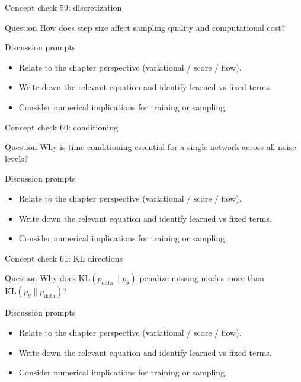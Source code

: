 \documentclass[aspectratio=169]{beamer}
\begin{document}
\begin{frame}{Concept check 59: discretization}
\begin{block}{Question}
How does step size affect sampling quality and computational cost?
\end{block}
\begin{block}{Discussion prompts}
\begin{itemize}
\item Relate to the chapter perspective (variational / score / flow).
\item Write down the relevant equation and identify learned vs fixed terms.
\item Consider numerical implications for training or sampling.
\end{itemize}
\end{block}
\end{frame}

\begin{frame}{Concept check 60: conditioning}
\begin{block}{Question}
Why is time conditioning essential for a single network across all noise levels?
\end{block}
\begin{block}{Discussion prompts}
\begin{itemize}
\item Relate to the chapter perspective (variational / score / flow).
\item Write down the relevant equation and identify learned vs fixed terms.
\item Consider numerical implications for training or sampling.
\end{itemize}
\end{block}
\end{frame}

\begin{frame}{Concept check 61: KL directions}
\begin{block}{Question}
Why does \(\mathrm{KL}(p_{\text{data}}\|p_\theta)\) penalize missing modes more than \(\mathrm{KL}(p_\theta\|p_{\text{data}})\)?
\end{block}
\begin{block}{Discussion prompts}
\begin{itemize}
\item Relate to the chapter perspective (variational / score / flow).
\item Write down the relevant equation and identify learned vs fixed terms.
\item Consider numerical implications for training or sampling.
\end{itemize}
\end{block}
\end{frame}
\end{document}
